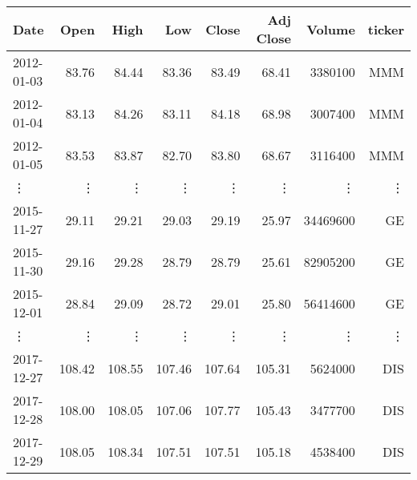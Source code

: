 \begin{tabular}{lrrrrrrr}
\toprule
Date &    Open &    High &     Low &   Close &  Adj Close &    Volume & ticker \\
\midrule
2012-01-03 &   83.76 &   84.44 &   83.36 &   83.49 &      68.41 &   3380100 & MMM\\
2012-01-04 &   83.13 &   84.26 &   83.11 &   84.18 &      68.98 &   3007400 & MMM \\
2012-01-05 &   83.53 &   83.87 &   82.70 &   83.80 &      68.67 &   3116400 & MMM \\
\vdots        &   \vdots   &   \vdots   &   \vdots   &   \vdots   &      \vdots   &   \vdots     & \vdots \\
2015-11-27 &   29.11 &   29.21 &   29.03 &   29.19 &      25.97 &  34469600 & GE \\
2015-11-30 &   29.16 &   29.28 &   28.79 &   28.79 &      25.61 &  82905200 & GE \\
2015-12-01 &   28.84 &   29.09 &   28.72 &   29.01 &      25.80 &  56414600 & GE \\
\vdots        &   \vdots   &   \vdots   &   \vdots   &   \vdots   &      \vdots   &   \vdots     & \vdots \\
2017-12-27 &  108.42 &  108.55 &  107.46 &  107.64 &     105.31 &   5624000 & DIS \\
2017-12-28 &  108.00 &  108.05 &  107.06 &  107.77 &     105.43 &   3477700 & DIS \\
2017-12-29 &  108.05 &  108.34 &  107.51 &  107.51 &     105.18 &   4538400 & DIS \\
\bottomrule
\end{tabular}
